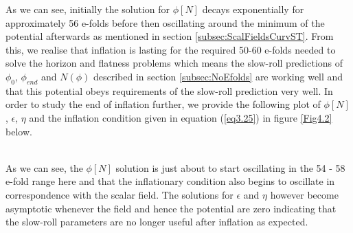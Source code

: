 \documentclass[a4paper,12pt,twoside]{report}
\begin{document}
As we can see, initially the solution for $\phi[N]$ decays exponentially for approximately 56 e-folds before then oscillating around the minimum of the potential afterwards as mentioned in section \ref{subsec:ScalFieldsCurvST}. From this, we realise that inflation is lasting for the required 50-60 e-folds needed to solve the horizon and flatness problems which means the slow-roll predictions of $\phi_{0}$, $\phi_{end}$ and $N(\phi)$ described in section \ref{subsec:NoEfolds} are working well and that this potential obeys requirements of the slow-roll prediction very well. In order to study the end of inflation further, we provide the following plot of $\phi[N]$, $\epsilon$, $\eta$ and the inflation condition given in equation (\ref{eq3.25}) in figure \ref{Fig4.2} below.

\noindent%
\begin{minipage}{\linewidth}%
\label{Fig4.2}
\end{minipage}
\\[10pt]

As we can see, the $\phi[N]$ solution is just about to start oscillating in the 54 - 58 e-fold range here and that the inflationary condition also begins to oscillate in correspondence with the scalar field. The solutions for $\epsilon$ and $\eta$ however become asymptotic whenever the field and hence the potential are zero indicating that the slow-roll parameters are no longer useful after inflation as expected.
\end{document}
